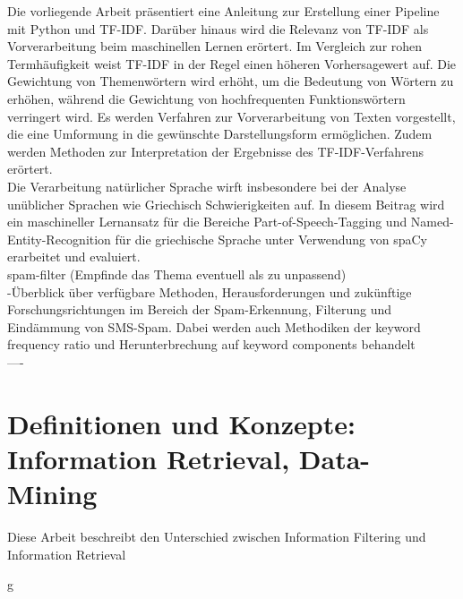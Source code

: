 Die vorliegende Arbeit präsentiert eine Anleitung zur Erstellung einer Pipeline mit Python und TF-IDF. Darüber hinaus wird die Relevanz von TF-IDF als Vorverarbeitung beim maschinellen Lernen erörtert. Im Vergleich zur rohen Termhäufigkeit weist TF-IDF in der Regel einen höheren Vorhersagewert auf. Die Gewichtung von Themenwörtern wird erhöht, um die Bedeutung von Wörtern zu erhöhen, während die Gewichtung von hochfrequenten Funktionswörtern verringert wird. Es werden Verfahren zur Vorverarbeitung von Texten vorgestellt, die eine Umformung in die gewünschte Darstellungsform ermöglichen. Zudem werden Methoden zur Interpretation der Ergebnisse des TF-IDF-Verfahrens erörtert.\cite{lavin2019analyzing}\\

Die Verarbeitung natürlicher Sprache wirft insbesondere bei der Analyse unüblicher Sprachen wie Griechisch Schwierigkeiten auf. In diesem Beitrag wird ein maschineller Lernansatz für die Bereiche Part-of-Speech-Tagging und Named-Entity-Recognition für die griechische Sprache unter Verwendung von spaCy erarbeitet und evaluiert. \cite{partalidou2019design}\\

spam-filter (Empfinde das Thema eventuell als zu unpassend)\\
-Überblick über verfügbare Methoden, Herausforderungen und zukünftige Forschungsrichtungen im Bereich der Spam-Erkennung, Filterung und Eindämmung von SMS-Spam. Dabei werden auch Methodiken der keyword frequency ratio und Herunterbrechung auf keyword components behandelt \cite{shafi2017review}\\

----


\section{Definitionen und Konzepte: Information Retrieval, Data-Mining}
\label{sec:definitionen-konzepte}

Diese Arbeit beschreibt den Unterschied zwischen Information Filtering und Information Retrieval\cite{belkin1992information}

\newpage
g
\newpage





